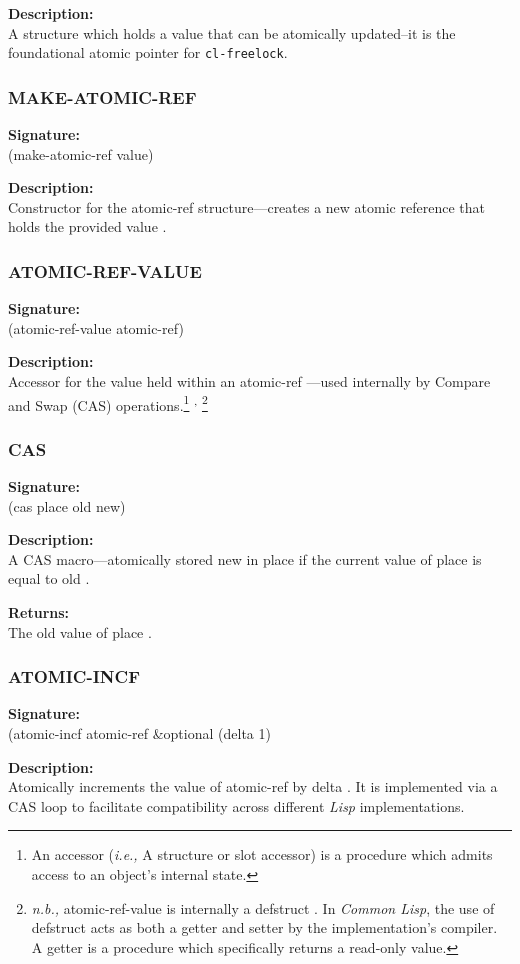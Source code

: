 \documentclass[12pt, letterpaper]{article}
\DeclareRobustCommand{\code}[1]{%
	\begingroup
	\setlength{\fboxsep}{2pt}%
	\colorbox{gray!15}{\ttfamily\small #1}%
	\endgroup
}
\newcommand{\supcom}{%
	\textsuperscript{,}
}
\newcommand{\customitem}[2]{%
	\noindent\textbf{#1}\\[0.5ex]%
	#2\vspace{1ex}%
}
\begin{document}
	\customitem{Description:}{A structure which holds a value that can be atomically updated--it is the foundational atomic pointer for \texttt{cl-freelock}.}

	\subsubsection{MAKE-ATOMIC-REF}
	
	\customitem{Signature:}{\code{(make-atomic-ref value)}}
	
	\customitem{Description:}{Constructor for the \code{atomic-ref} structure---creates a new atomic reference that holds the provided \code{value}.}
	
	\subsubsection{ATOMIC-REF-VALUE}
	
	\customitem{Signature:}{\code{(atomic-ref-value atomic-ref)}}
	
	
	
	\customitem{Description:}{Accessor for the value held within an \code{atomic-ref}---used internally by Compare and Swap (CAS) operations.\footnote{An accessor (\textit{i.e.,} A structure or slot accessor) is a procedure which admits access to an object's internal state.}\supcom\footnote{\textit{n.b.,} \code{atomic-ref-value} is internally a \code{defstruct}. In \textit{Common Lisp}, the use of \code{defstruct} acts as both a getter and setter by the implementation's compiler. A getter is a procedure which specifically returns a read-only value.}}
	\subsubsection{CAS}
	
	\customitem{Signature:}{\code{(cas place old new)}}
	
	\customitem{Description:}{A CAS macro---atomically stored \code{new} in \code{place} if the current value of \code{place} is equal to \code{old}.}
	
	\customitem{Returns:}{The old value of \code{place}.}
	\subsubsection{ATOMIC-INCF}
	
	\customitem{Signature:}{\code{(atomic-incf atomic-ref \&optional (delta 1)}}
	
	\customitem{Description:}{Atomically increments the value of \code{atomic-ref} by \code{delta}. It is implemented via a CAS loop to facilitate compatibility across different \textit{Lisp} implementations.}
	
\end{document}
